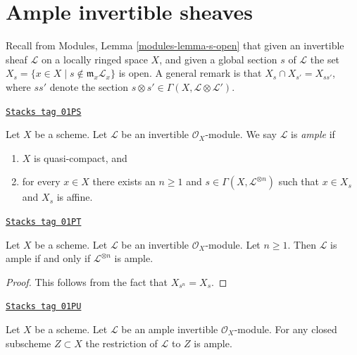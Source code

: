 \section{Ample invertible sheaves}
\label{properties-section-ample}
Recall from Modules, Lemma \ref{modules-lemma-s-open}
that given an invertible sheaf $\mathcal{L}$ on a locally ringed
space $X$, and given a global section $s$ of $\mathcal{L}$
the set $X_s = \{x \in X \mid s \not \in \mathfrak m_x\mathcal{L}_x\}$
is open. A general remark is that
$X_s \cap X_{s'} = X_{ss'}$, where $ss'$ denote
the section $s \otimes s' \in \Gamma(X, \mathcal{L} \otimes \mathcal{L}')$.

\begin{definition}[Ample]
\label{properties-definition-ample}
\href{https://stacks.math.columbia.edu/tag/01PS}{\texttt{Stacks tag 01PS}}

\begin{reference}
\cite[II Definition 4.5.3]{EGA}
\end{reference}
Let $X$ be a scheme.
Let $\mathcal{L}$ be an invertible $\mathcal{O}_X$-module.
We say $\mathcal{L}$ is {\it ample} if
\begin{enumerate}
\item $X$ is quasi-compact, and
\item for every $x \in X$ there exists an $n \geq 1$
and $s \in \Gamma(X, \mathcal{L}^{\otimes n})$ such
that $x \in X_s$ and $X_s$ is affine.
\end{enumerate}
\end{definition}

\begin{lemma}
\label{properties-lemma-ample-power-ample}
\href{https://stacks.math.columbia.edu/tag/01PT}{\texttt{Stacks tag 01PT}}

\begin{reference}
\cite[II Proposition 4.5.6(i)]{EGA}
\end{reference}
Let $X$ be a scheme. Let $\mathcal{L}$ be an invertible $\mathcal{O}_X$-module.
Let $n \geq 1$. Then $\mathcal{L}$ is ample if and only if
$\mathcal{L}^{\otimes n}$ is ample.
\end{lemma}

\begin{proof}
This follows from the fact that $X_{s^n} = X_s$.
\end{proof}

\begin{lemma}
\label{properties-lemma-ample-on-closed}
\href{https://stacks.math.columbia.edu/tag/01PU}{\texttt{Stacks tag 01PU}}

Let $X$ be a scheme.
Let $\mathcal{L}$ be an ample invertible $\mathcal{O}_X$-module.
For any closed subscheme $Z \subset X$ the restriction of
$\mathcal{L}$ to $Z$ is ample.
\end{lemma}

